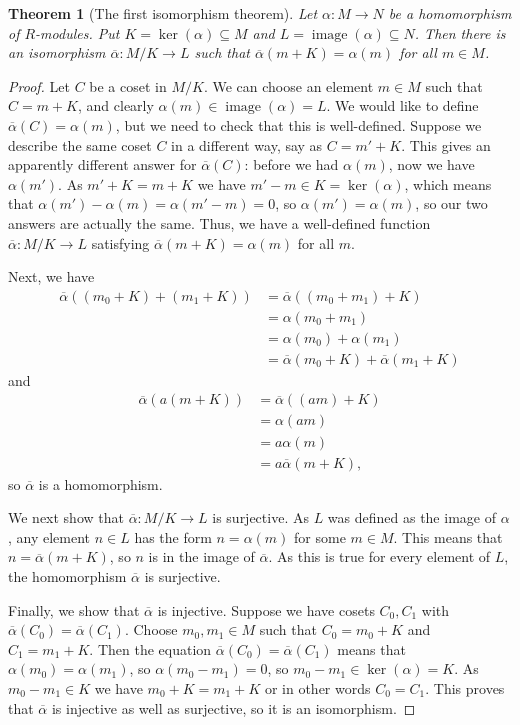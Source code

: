 \documentclass{amsart}
\newcommand{\img}       {\operatorname{image}}
\newcommand{\al}        {\alpha}
\newcommand{\alb}       {\overline{\alpha}}
\newcommand{\sse}       {\subseteq}
\newcommand{\xra}       {\xrightarrow}
\renewcommand{\:}{\colon}
\newtheorem{theorem}{Theorem}[section]
\theoremstyle{definition}
\begin{document}
\begin{theorem}[The first isomorphism theorem]
 Let $\al\:M\xra{}N$ be a homomorphism of $R$-modules.  Put
 $K=\ker(\al)\sse M$ and $L=\img(\al)\sse N$.  Then there is an
 isomorphism $\alb\:M/K\xra{}L$ such that $\alb(m+K)=\al(m)$
 for all $m\in M$.
\end{theorem}
\begin{proof}
 Let $C$ be a coset in $M/K$.  We can choose an element $m\in M$ such
 that $C=m+K$, and clearly $\al(m)\in\img(\al)=L$.  We would like to
 define $\alb(C)=\al(m)$, but we need to check that this is
 well-defined.  Suppose we describe the same coset $C$ in a different
 way, say as $C=m'+K$.  This gives an apparently different answer for
 $\alb(C)$: before we had $\al(m)$, now we have $\al(m')$.  As
 $m'+K=m+K$ we have $m'-m\in K=\ker(\al)$, which means that
 $\al(m')-\al(m)=\al(m'-m)=0$, so $\al(m')=\al(m)$, so our two answers
 are actually the same.  Thus, we have a well-defined function
 $\alb\:M/K\xra{}L$ satisfying $\alb(m+K)=\al(m)$ for all $m$.

 Next, we have
 \begin{align*}
  \alb((m_0+K)+(m_1+K)) &= \alb((m_0+m_1)+K) \\
                        &= \al(m_0+m_1) \\
                        &= \al(m_0) + \al(m_1) \\
                        &= \alb(m_0+K) + \alb(m_1+K) 
 \end{align*}
 and
 \begin{align*}
  \alb(a(m+K)) &= \alb((am)+K) \\
               &= \al(am) \\
               &= a\al(m) \\
               &= a \alb(m+K),
 \end{align*}
 so $\alb$ is a homomorphism.

 We next show that $\alb\:M/K\xra{}L$ is surjective.  As $L$ was
 defined as the image of $\al$, any element $n\in L$ has the form
 $n=\al(m)$ for some $m\in M$.  This means that $n=\alb(m+K)$, so $n$
 is in the image of $\alb$.  As this is true for every element of $L$,
 the homomorphism $\alb$ is surjective.

 Finally, we show that $\alb$ is injective.  Suppose we have cosets
 $C_0,C_1$ with $\alb(C_0)=\alb(C_1)$.  Choose $m_0,m_1\in M$ such
 that $C_0=m_0+K$ and $C_1=m_1+K$.  Then the equation
 $\alb(C_0)=\alb(C_1)$ means that $\al(m_0)=\al(m_1)$, so
 $\al(m_0-m_1)=0$, so $m_0-m_1\in\ker(\al)=K$.  As $m_0-m_1\in K$ we
 have $m_0+K=m_1+K$ or in other words $C_0=C_1$.  This proves that
 $\alb$ is injective as well as surjective, so it is an isomorphism.
\end{proof}
\end{document}
